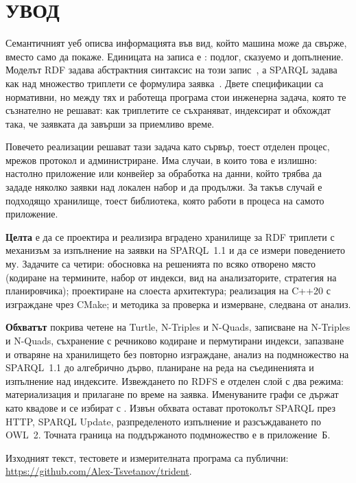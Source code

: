 \section*{УВОД}
\label{sec:introduction}

Семантичният уеб описва информацията във вид, който машина може да свърже, вместо само да
покаже. Единицата на записа е : подлог, сказуемо и допълнение. Моделът RDF
задава абстрактния синтаксис на този запис~\cite{w3c_rdf11_concepts}, а SPARQL задава как над
множество триплети се формулира заявка~\cite{w3c_sparql11_query}. Двете спецификации са
нормативни, но между тях и работеща програма стои инженерна задача, която те съзнателно не
решават: как триплетите се съхраняват, индексират и обхождат така, че заявката да завърши за
приемливо време.

Повечето реализации решават тази задача като сървър, тоест отделен процес, мрежов протокол и
администриране. Има случаи, в които това е излишно: настолно приложение или конвейер за
обработка на данни, който трябва да зададе няколко заявки над локален набор и да продължи. За
такъв случай е подходящо  хранилище, тоест библиотека, която работи в процеса
на самото приложение.

\textbf{Целта} е да се проектира и реализира вградено хранилище за RDF триплети с механизъм за
изпълнение на заявки на SPARQL~1.1 и да се измери поведението му. Задачите са четири:
обосновка на решенията по всяко отворено място (кодиране на термините, набор от индекси, вид
на анализаторите, стратегия на планировчика); проектиране на слоеста архитектура; реализация
на C++20 с изграждане чрез CMake; и методика за проверка и измерване, следвана от анализ.

\textbf{Обхватът} покрива четене на Turtle, N-Triples и N-Quads, записване на N-Triples и
N-Quads, съхранение с речниково кодиране и пермутирани индекси, запазване и отваряне на
хранилището без повторно изграждане, анализ на подмножество на SPARQL~1.1 до алгебрично
дърво, планиране на реда на съединенията и изпълнение над индексите. Извеждането по RDFS е
отделен слой с два режима: материализация и прилагане по време на заявка. Именуваните графи
се държат като квадове и се избират с . Извън обхвата остават протоколът SPARQL
през HTTP, SPARQL Update, разпределеното изпълнение и разсъждаването по OWL~2. Точната
граница на поддържаното подмножество е в приложение~Б.

Изходният текст, тестовете и измерителната програма са публични:
\url{https://github.com/Alex-Tsvetanov/trident}.
